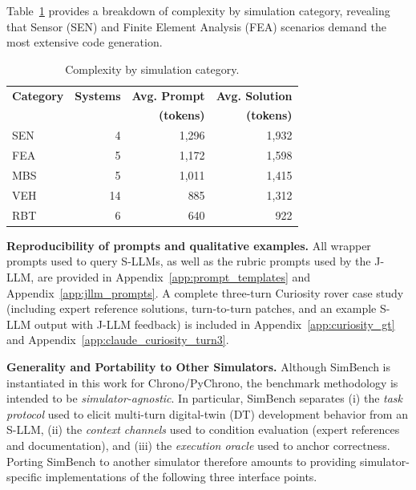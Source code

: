 Table~\ref{tab:category_complexity} provides a breakdown of complexity by simulation category, revealing that Sensor (SEN) and Finite Element Analysis (FEA) scenarios demand the most extensive code generation.

\begin{table}[h!]
    \centering
    \caption{Complexity by simulation category.}
    \label{tab:category_complexity}
    \begin{tabular}{l r r r}
        \toprule
        \textbf{Category} & \textbf{Systems} & \textbf{Avg. Prompt} & \textbf{Avg. Solution} \\
        & & \textbf{(tokens)} & \textbf{(tokens)} \\
        \midrule
        SEN & 4 & 1,296 & 1,932 \\
        FEA & 5 & 1,172 & 1,598 \\
        MBS & 5 & 1,011 & 1,415 \\
        VEH & 14 & 885 & 1,312 \\
        RBT & 6 & 640 & 922 \\
        \bottomrule
    \end{tabular}
\end{table}

\noindent\textbf{Reproducibility of prompts and qualitative examples.}
All wrapper prompts used to query S-LLMs, as well as the rubric prompts used by the J-LLM, are provided in Appendix~\ref{app:prompt_templates} and Appendix~\ref{app:jllm_prompts}.
A complete three-turn Curiosity rover case study (including expert reference solutions, turn-to-turn patches, and an example S-LLM output with J-LLM feedback) is included in Appendix~\ref{app:curiosity_gt} and Appendix~\ref{app:claude_curiosity_turn3}.

\bigskip

\noindent\textbf{Generality and Portability to Other Simulators.}
Although SimBench is instantiated in this work for Chrono/PyChrono, the benchmark methodology is intended to be \emph{simulator-agnostic}. In particular, SimBench separates (i) the \emph{task protocol} used to elicit multi-turn digital-twin (DT) development behavior from an S-LLM, (ii) the \emph{context channels} used to condition evaluation (expert references and documentation), and (iii) the \emph{execution oracle} used to anchor correctness. Porting SimBench to another simulator therefore amounts to providing simulator-specific implementations of the following three interface points.

